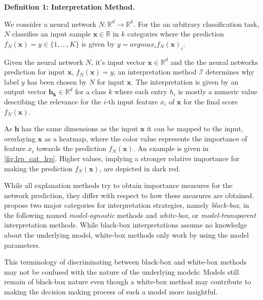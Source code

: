 \documentclass[sigconf]{acmart}
\begin{document}
\textbf{Definition 1: Interpretation Method.}

\setlength{\leftskip}{0.39cm}

  \noindent We consider a neural network $N: \mathbb{R}^d \to \mathbb{R}^k$. For the an arbitrary classification task, $N$ classifies an input sample $\mathbf{x}\in \mathbb{R}$ in $k$ categories where the prediction $f_N(\mathbf{x})=y \in \{1, ..., K\}$ is given by $y = arg max_i f_N(\mathbf{x})_i$.

  Given the neural network $N$, it's input vector $\mathbf{x} \in \mathbb{R}^d$ and the the neural networks prediction for input $\mathbf{x}$, $f_N(\mathbf{x})=y$, an interpretation method $\mathcal{I}$ determines why label $y$ has been chosen by $N$ for input $\mathbf{x}$. 
  The interpretation is given by an output vector $\mathbf{h_k} \in \mathbb{R}^d$ for a class $k$ where each entry $h_i$ is mostly a numeric value describing the relevance for the $i$-th input feature $x_i$ of $\mathbf{x}$ for the final score $f_N(\mathbf{x})$.

\setlength{\leftskip}{0pt}
\par\smallskip\vspace{-0.1cm}

As $\mathbf{h}$ has the same dimensions as the input $\mathbf{x}$ it can be mapped to the input, overlaying $\mathbf{x}$ as a heatmap, where the color value represents the importance of feature $x_i$ towards the prediction $f_N(\mathbf{x})$.
An example is given in \autoref{fig:lrp_cat_lrp}. Higher values, implying a stronger relative importance for making the prediction $f_N(\mathbf{x})$, are depicted in dark red. 

While all explanation methods try to obtain importance measures for the network prediction, they differ with respect to how these measures are obtained. \cite{evaluating_explanations_security} propose two major categories for interpretation strategies, namely \textit{black-box}, in the following named \textit{model-agnostic} methods and \textit{white-box}, or \textit{model-transparent} interpretation methods. 
While black-box interpretations assume no knowledge about the underlying model, white-box methods only work by using the model parameters. 

This terminology of discriminating between black-box and white-box methods may not be confused with the nature of the underlying models: Models still remain of black-box nature even though a white-box method may contribute to making the decision making process of such a model more insightful.
\end{document}
